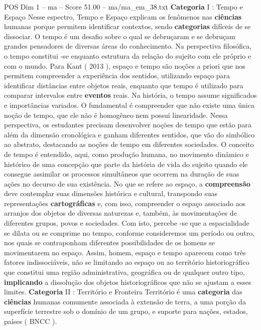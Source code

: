 \begin{textsample}{POS Dim 1 – ma – Score 51.00 – ma/ma\_em\_38.txt}  \label{ex:f1_pos_068}
\textbf{Categoria} I : Tempo e Espaço Nesse espectro, Tempo e Espaço explicam os fenômenos nas \textbf{ciências} humanas porque permitem identificar contextos, sendo \textbf{categorias} difíceis de se dissociar.
O tempo é um desafio sobre o qual se debruçaram e se debruçam grandes pensadores de diversas áreas do conhecimento.
Na perspectiva filosófica, o tempo constitui -se enquanto estrutura da relação do sujeito com ele próprio e com o mundo.
Para Kant ( 2013 ), espaço e tempo são noções a priori que nos permitem compreender a experiência dos sentidos, utilizando espaço para identificar distâncias entre objetos reais, enquanto que tempo é utilizado para comparar intervalos entre \textbf{eventos} reais.
Na história, o tempo assume significados e importâncias variados.
O fundamental é compreender que não existe uma única noção de tempo, que ele não é homogêneo nem possui linearidade.
Nessa perspectiva, os estudantes precisam desenvolver noções de tempo que estão para além da dimensão cronológica e ganham diferentes sentidos, que vão do simbólico ao abstrato, destacando as noções de tempo em diferentes sociedades.
O conceito de tempo é entendido, aqui, como produção humana, no movimento dinâmico e histórico de uma concepção que parte da história de vida do sujeito quando ele consegue assimilar os processos simultâneos que ocorrem na duração de suas ações no decurso de sua existência.
No que se refere ao espaço, a \textbf{compreensão} deve contemplar suas dimensões histórica e cultural, transpondo suas representações \textbf{cartográficas} e, com isso, compreender o espaço associado aos arranjos dos objetos de diversas naturezas e, também, às movimentações de diferentes grupos, povos e sociedades.
Com isto, percebe -se que a espacialidade se dilata ou se comprime no tempo, conforme consideremos um período ou outro, nos quais se contraponham diferentes possibilidades de os homens se movimentarem no espaço.
Assim, homem, espaço e tempo aparecem como três fatores indissociáveis, não se limitando ao espaço ou ao território historiográfico que constitui uma região administrativa, geográfica ou de qualquer outro tipo, \textbf{implicando} a dissolução dos objetos historiográficos que não se ajustam a esses limites. \textbf{Categoria} II : Território e Fronteira Território é uma \textbf{categoria} das \textbf{ciências} humanas comumente associada à extensão de terra, a uma porção da superfície terrestre sob o domínio de um grupo, e suporte para nações, estados, países ( BNCC ).

\end{textsample}
